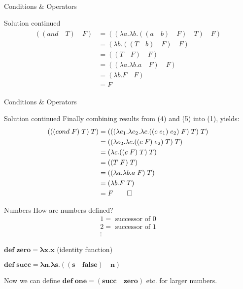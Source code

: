 \documentclass{beamer}
\begin{document}
\begin{frame}{Conditions \& Operators}
\begin{block}{Solution continued}
\begin{align}
\begin{split}
	((and \quad T) \quad F) &= ((\lambda a . \lambda b . ((a \quad b) \quad F) \quad T) \quad F) \\
    &= (\lambda b . ((T \quad b) \quad F) \quad F) \\
    &= ((T \quad F) \quad F) \\
    &= ((\lambda a . \lambda b . a \quad F) \quad F) \\
    &= (\lambda b . F \quad F) \\
    &= F
\end{split}
\end{align}
\end{block}
\end{frame}

\begin{frame}{Conditions \& Operators}
\begin{block}{Solution continued}
Finally combining results from (4) and (5) into (1), yields:
\begin{align}
\begin{split}
	(((cond \; F) \; T) \; T) &= (((\lambda e_1 . \lambda e_2. \lambda c . ((c \; e_1) \; e_2) \; F) \; T) \; T) \\
    &= ((\lambda e_2 . \lambda c . ((c \; F) \; e_2) \; T) \; T) \\
    &= (\lambda c . ((c \; F) \; T) \; T) \\
    &= ((T \; F) \; T) \\
    &= ((\lambda a . \lambda b . a \; F) \; T) \\
    &= (\lambda b . F \; T) \\
    &= F
    \qed
\end{split}
\end{align}
\end{block}
\end{frame}

\begin{frame}{Numbers}
How are numbers defined?
\begin{gather*}
	1 = \text{ successor of } 0 \\
    2 = \text{ successor of } 1 \\
    \vdots
\end{gather*}
\begin{framed} $\mathbf{def \; zero = \lambda x . x}$ \hfill (identity function) \end{framed}
\begin{framed} $\mathbf{def \; succ = \lambda n . \lambda s . ((s \quad false) \quad n)}$ \end{framed}
Now we can define $\mathbf{def \; one = (succ \quad zero)}$ etc. for larger numbers.
\end{frame}
\end{document}
